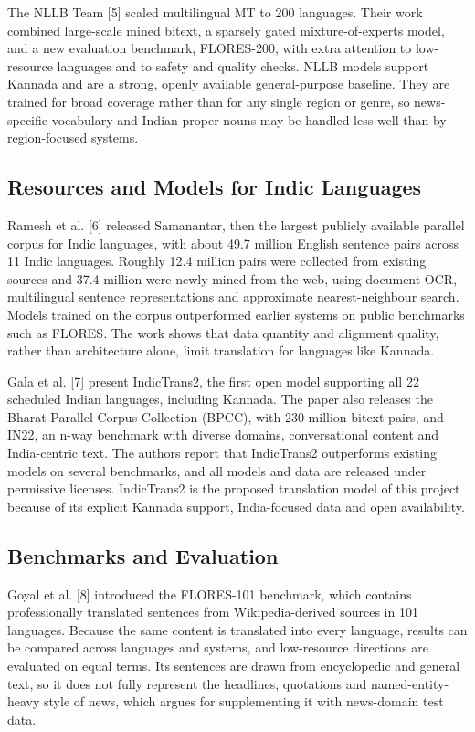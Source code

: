 \documentclass[conference]{IEEEtran}
\begin{document}
The NLLB Team [5] scaled multilingual MT to 200 languages. Their work combined large-scale mined bitext, a sparsely gated mixture-of-experts model, and a new evaluation benchmark, FLORES-200, with extra attention to low-resource languages and to safety and quality checks. NLLB models support Kannada and are a strong, openly available general-purpose baseline. They are trained for broad coverage rather than for any single region or genre, so news-specific vocabulary and Indian proper nouns may be handled less well than by region-focused systems.

\subsection{Resources and Models for Indic Languages}
Ramesh et al. [6] released Samanantar, then the largest publicly available parallel corpus for Indic languages, with about 49.7 million English sentence pairs across 11 Indic languages. Roughly 12.4 million pairs were collected from existing sources and 37.4 million were newly mined from the web, using document OCR, multilingual sentence representations and approximate nearest-neighbour search. Models trained on the corpus outperformed earlier systems on public benchmarks such as FLORES. The work shows that data quantity and alignment quality, rather than architecture alone, limit translation for languages like Kannada.

Gala et al. [7] present IndicTrans2, the first open model supporting all 22 scheduled Indian languages, including Kannada. The paper also releases the Bharat Parallel Corpus Collection (BPCC), with 230 million bitext pairs, and IN22, an n-way benchmark with diverse domains, conversational content and India-centric text. The authors report that IndicTrans2 outperforms existing models on several benchmarks, and all models and data are released under permissive licenses. IndicTrans2 is the proposed translation model of this project because of its explicit Kannada support, India-focused data and open availability.

\subsection{Benchmarks and Evaluation}
Goyal et al. [8] introduced the FLORES-101 benchmark, which contains professionally translated sentences from Wikipedia-derived sources in 101 languages. Because the same content is translated into every language, results can be compared across languages and systems, and low-resource directions are evaluated on equal terms. Its sentences are drawn from encyclopedic and general text, so it does not fully represent the headlines, quotations and named-entity-heavy style of news, which argues for supplementing it with news-domain test data.
\end{document}
